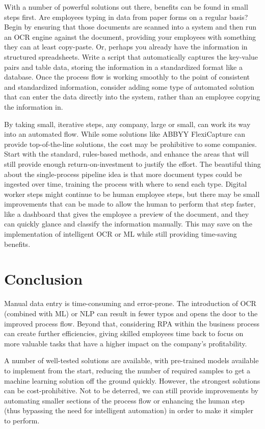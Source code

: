 \documentclass[conference]{IEEEtran}
\begin{document}
With a number of powerful solutions out there, benefits can be found in small steps first. Are employees typing in data from paper forms on a regular basis? Begin by ensuring that those documents are scanned into a system and then run an OCR engine against the document, providing your employees with something they can at least copy-paste. Or, perhaps you already have the information in structured spreadsheets. Write a script that automatically captures the key-value pairs and table data, storing the information in a standardized format like a database. Once the process flow is working smoothly to the point of consistent and standardized information, consider adding some type of automated solution that can enter the data directly into the system, rather than an employee copying the information in.

By taking small, iterative steps, any company, large or small, can work its way into an automated flow. While some solutions like ABBYY FlexiCapture can provide top-of-the-line solutions, the cost may be prohibitive to some companies. Start with the standard, rules-based methods, and enhance the areas that will still provide enough return-on-investment to justify the effort. The beautiful thing about the single-process pipeline idea is that more document types could be ingested over time, training the process with where to send each type. Digital worker steps might continue to be human employee steps, but there may be small improvements that can be made to allow the human to perform that step faster, like a dashboard that gives the employee a preview of the document, and they can quickly glance and classify the information manually. This may save on the implementation of intelligent OCR or ML while still providing time-saving benefits.

\section{Conclusion}
Manual data entry is time-consuming and error-prone. The introduction of OCR (combined with ML) or NLP can result in fewer typos and opens the door to the improved process flow. Beyond that, considering RPA within the business process can create further efficiencies, giving skilled employees time back to focus on more valuable tasks that have a higher impact on the company's profitability.

A number of well-tested solutions are available, with pre-trained models available to implement from the start, reducing the number of required samples to get a machine learning solution off the ground quickly. However, the strongest solutions can be cost-prohibitive. Not to be deterred, we can still provide improvements by automating smaller sections of the process flow or enhancing the human step (thus bypassing the need for intelligent automation) in order to make it simpler to perform.
\end{document}
